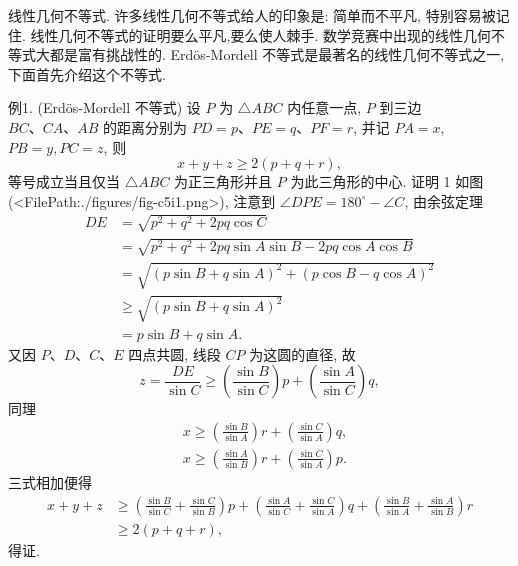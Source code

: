 
线性几何不等式.
许多线性几何不等式给人的印象是: 简单而不平凡, 特别容易被记住.
线性几何不等式的证明要么平凡,要么使人棘手.
数学竞赛中出现的线性几何不等式大都是富有挑战性的.
Erdös-Mordell 不等式是最著名的线性几何不等式之一,下面首先介绍这个不等式.



例1. (Erdös-Mordell 不等式) 设 $P$ 为 $\triangle A B C$ 内任意一点, $P$ 到三边 $B C 、 C A 、 A B$ 的距离分别为 $P D=p 、 P E=q 、 P F=r$, 并记 $P A=x$, $P B=y, P C=z$, 则
$$
x+y+z \geqslant 2(p+q+r),
$$
等号成立当且仅当 $\triangle A B C$ 为正三角形并且 $P$ 为此三角形的中心.
证明 1 如图(<FilePath:./figures/fig-c5i1.png>), 注意到 $\angle D P E=180^{\circ}- \angle C$, 由余弦定理
$$
\begin{aligned}
D E & =\sqrt{p^2+q^2+2 p q \cos C} \\
& =\sqrt{p^2+q^2+2 p q \sin A \sin B-2 p q \cos A \cos B} \\
& =\sqrt{(p \sin B+q \sin A)^2+(p \cos B-q \cos A)^2} \\
& \geqslant \sqrt{(p \sin B+q \sin A)^2} \\
& =p \sin B+q \sin A .
\end{aligned}
$$
又因 $P 、 D 、 C 、 E$ 四点共圆, 线段 $C P$ 为这圆的直径, 故
$$
z=\frac{D E}{\sin C} \geqslant\left(\frac{\sin B}{\sin C}\right) p+\left(\frac{\sin A}{\sin C}\right) q,
$$
同理
$$
\begin{aligned}
& x \geqslant\left(\frac{\sin B}{\sin A}\right) r+\left(\frac{\sin C}{\sin A}\right) q, \\
& x \geqslant\left(\frac{\sin A}{\sin B}\right) r+\left(\frac{\sin C}{\sin A}\right) p .
\end{aligned}
$$
三式相加便得
$$
\begin{aligned}
x+y+z & \geqslant\left(\frac{\sin B}{\sin C}+\frac{\sin C}{\sin B}\right) p+\left(\frac{\sin A}{\sin C}+\frac{\sin C}{\sin A}\right) q+\left(\frac{\sin B}{\sin A}+\frac{\sin A}{\sin B}\right) r \\
& \geqslant 2(p+q+r),
\end{aligned}
$$
得证.



